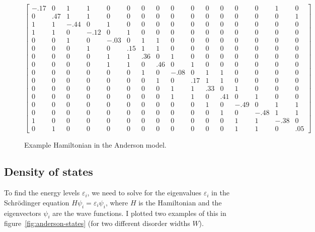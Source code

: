 \documentclass{revtex4}
\begin{document}
\begin{figure}[h!]
{\tiny \[ \left[
\begin{array}{cccccccccccccccc}
-.17 & 0 & 1 & 1 & 0 & 0 & 0 & 0 & 0 & 0 & 0 & 0 & 0 & 0 & 1 & 0 \\
0 & .47 & 1 & 1 & 0 & 0 & 0 & 0 & 0 & 0 & 0 & 0 & 0 & 0 & 0 & 1 \\
1 & 1 & -.44 & 0 & 1 & 0 & 0 & 0 & 0 & 0 & 0 & 0 & 0 & 0 & 0 & 0 \\
1 & 1 & 0 & -.12 & 0 & 1 & 0 & 0 & 0 & 0 & 0 & 0 & 0 & 0 & 0 & 0 \\
0 & 0 & 1 & 0 & -.03 & 0 & 1 & 1 & 0 & 0 & 0 & 0 & 0 & 0 & 0 & 0 \\
0 & 0 & 0 & 1 & 0 & .15 & 1 & 1 & 0 & 0 & 0 & 0 & 0 & 0 & 0 & 0 \\
0 & 0 & 0 & 0 & 1 & 1 & .36 & 0 & 1 & 0 & 0 & 0 & 0 & 0 & 0 & 0 \\
0 & 0 & 0 & 0 & 1 & 1 & 0 & .46 & 0 & 1 & 0 & 0 & 0 & 0 & 0 & 0 \\
0 & 0 & 0 & 0 & 0 & 0 & 1 & 0 & -.08 & 0 & 1 & 1 & 0 & 0 & 0 & 0 \\
0 & 0 & 0 & 0 & 0 & 0 & 0 & 1 & 0 & .17 & 1 & 1 & 0 & 0 & 0 & 0 \\
0 & 0 & 0 & 0 & 0 & 0 & 0 & 0 & 1 & 1 & .33 & 0 & 1 & 0 & 0 & 0 \\
0 & 0 & 0 & 0 & 0 & 0 & 0 & 0 & 1 & 1 & 0 & .41 & 0 & 1 & 0 & 0 \\
0 & 0 & 0 & 0 & 0 & 0 & 0 & 0 & 0 & 0 & 1 & 0 & -.49 & 0 & 1 & 1 \\
0 & 0 & 0 & 0 & 0 & 0 & 0 & 0 & 0 & 0 & 0 & 1 & 0 & -.48 & 1 & 1 \\
1 & 0 & 0 & 0 & 0 & 0 & 0 & 0 & 0 & 0 & 0 & 0 & 1 & 1 & -.38 & 0 \\
0 & 1 & 0 & 0 & 0 & 0 & 0 & 0 & 0 & 0 & 0 & 0 & 1 & 1 & 0 & .05
\end{array}
\right] \] }
\caption{Example Hamiltonian in the Anderson model.}
\label{fig:anderson-hamiltonian}
\end{figure}

\subsection{Density of states}

To find the energy levels $\varepsilon_i$, we need to solve for the eigenvalues $\varepsilon_i$ in the Schr\"{o}dinger equation $H \psi_i = \varepsilon_i \psi_i$, where $H$ is the Hamiltonian and the eigenvectors $\psi_i$ are the wave functions. I plotted two examples of this in figure~\ref{fig:anderson-states} (for two different disorder widths $W$).
\end{document}
